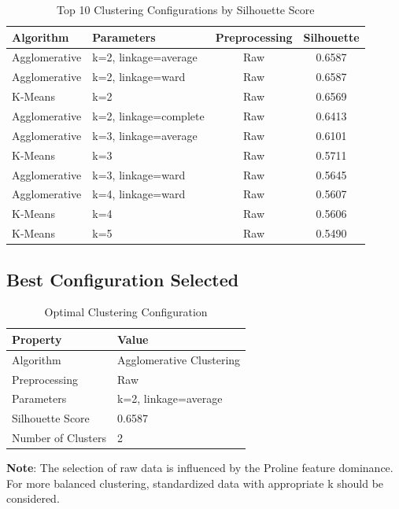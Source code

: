 \documentclass[12pt,a4paper]{article}
\begin{document}
\begin{table}[H]
\centering
\caption{Top 10 Clustering Configurations by Silhouette Score}
\label{tab:auto_clustering}
\begin{tabular}{llcc}
\toprule
\textbf{Algorithm} & \textbf{Parameters} & \textbf{Preprocessing} & \textbf{Silhouette} \\
\midrule
Agglomerative & k=2, linkage=average & Raw & 0.6587 \\
Agglomerative & k=2, linkage=ward & Raw & 0.6587 \\
K-Means & k=2 & Raw & 0.6569 \\
Agglomerative & k=2, linkage=complete & Raw & 0.6413 \\
Agglomerative & k=3, linkage=average & Raw & 0.6101 \\
K-Means & k=3 & Raw & 0.5711 \\
Agglomerative & k=3, linkage=ward & Raw & 0.5645 \\
Agglomerative & k=4, linkage=ward & Raw & 0.5607 \\
K-Means & k=4 & Raw & 0.5606 \\
K-Means & k=5 & Raw & 0.5490 \\
\bottomrule
\end{tabular}
\end{table}

\subsection{Best Configuration Selected}

\begin{table}[H]
\centering
\caption{Optimal Clustering Configuration}
\begin{tabular}{ll}
\toprule
\textbf{Property} & \textbf{Value} \\
\midrule
Algorithm & Agglomerative Clustering \\
Preprocessing & Raw \\
Parameters & k=2, linkage=average \\
Silhouette Score & 0.6587 \\
Number of Clusters & 2 \\
\bottomrule
\end{tabular}
\end{table}

\textbf{Note}: The selection of raw data is influenced by the Proline feature dominance. For more balanced clustering, standardized data with appropriate k should be considered.
\end{document}
